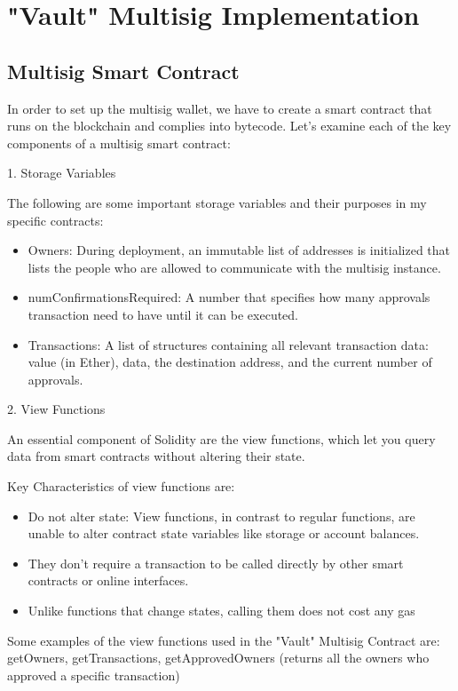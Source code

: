 \chapter{"Vault" Multisig Implementation}
\section{Multisig Smart Contract}
\label{ch4sec1}
In order to set up the multisig wallet, we have to create a smart contract that runs on the blockchain and complies into bytecode.  Let's examine each of the key components of a multisig smart contract:
\par 1. Storage Variables
\par The following are some important storage variables and their purposes in my specific contracts:
 \begin{itemize}
 	\item Owners: During deployment, an immutable list of addresses is initialized that lists the people who are allowed to communicate with the multisig instance.
 	\item numConfirmationsRequired: A number that specifies how many approvals transaction need to have until it can be executed.
 	\item Transactions:  A list of structures containing all relevant transaction data: value (in Ether), data, the destination address, and the current number of approvals.
 \end{itemize}
\par 2. View Functions
\par An essential component of Solidity are the view functions, which let you query data from smart contracts without altering their state.
\par Key Characteristics of view functions are:
 \begin{itemize}
	\item Do not alter state: View functions, in contrast to regular functions, are unable to alter contract state variables like storage or account balances.
	\item They don't require a transaction to be called directly by other smart contracts or online interfaces.
	\item Unlike functions that change states, calling them does not cost any gas
\end{itemize}
Some examples of the view functions used in the "Vault" Multisig Contract are: getOwners, getTransactions, getApprovedOwners (returns all the owners who approved a specific transaction)
